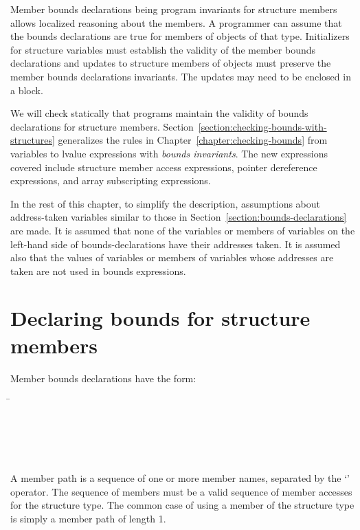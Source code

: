 Member bounds declarations being program invariants for structure members allows
localized reasoning about the members. A programmer can assume that the
bounds declarations are true for members of objects of that type.   Initializers for
structure variables must establish the validity of the member bounds declarations and
updates to structure members of objects must preserve the member bounds
declarations invariants.  The updates may need to be enclosed in a 
 block.

We will check statically that programs maintain the validity of bounds
declarations for structure members.   
Section~\ref{section:checking-bounds-with-structures} generalizes
the rules in Chapter~\ref{chapter:checking-bounds} from variables
to lvalue expressions with {\em bounds invariants}.  The new
expressions covered include structure member access expressions, 
pointer dereference expressions, and array subscripting expressions.   

In the rest of this chapter, to simplify the description, assumptions
about address-taken variables similar to those in
Section~\ref{section:bounds-declarations} are made.
It is assumed that none of the variables or members of variables on the
left-hand side of bounds-declarations have their addresses taken. It is
assumed also that the values of variables or members of variables whose
addresses are taken are not used in bounds expressions.

\section{Declaring bounds for structure members}

Member bounds declarations have the form:
\begin{tabbing}
\=\\
\>  \code{:}  \\
\\
\\
\>  \\
\>   
\end{tabbing}

A member path is a sequence of one or more member names, separated by
the `' operator. The sequence of members must be a valid sequence of
member accesses for the structure type. The common case of using a
member of the structure type is simply a member path of length 1.

